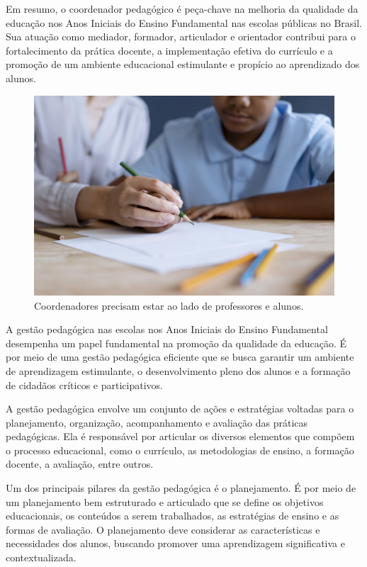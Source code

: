 Em resumo, o coordenador pedagógico é peça-chave na melhoria da
qualidade da educação nos Anos Iniciais do Ensino Fundamental nas
escolas públicas no Brasil. Sua atuação como mediador, formador,
articulador e orientador contribui para o fortalecimento da prática
docente, a implementação efetiva do currículo e a promoção de um
ambiente educacional estimulante e propício ao aprendizado dos alunos.

\begin{figure}
\centering
\includegraphics[width=\textwidth]{./imgs/Imagem004.jpg}
\caption{Coordenadores precisam estar ao lado de professores e alunos.}
\end{figure}

A gestão pedagógica nas escolas nos Anos Iniciais do Ensino Fundamental
desempenha um papel fundamental na promoção da qualidade da educação. É
por meio de uma gestão pedagógica eficiente que se busca garantir um
ambiente de aprendizagem estimulante, o desenvolvimento pleno dos alunos
e a formação de cidadãos críticos e participativos.

A gestão pedagógica envolve um conjunto de ações e estratégias voltadas
para o planejamento, organização, acompanhamento e avaliação das
práticas pedagógicas. Ela é responsável por articular os diversos
elementos que compõem o processo educacional, como o currículo, as
metodologias de ensino, a formação docente, a avaliação, entre outros.

Um dos principais pilares da gestão pedagógica é o planejamento. É por
meio de um planejamento bem estruturado e articulado que se define os
objetivos educacionais, os conteúdos a serem trabalhados, as estratégias
de ensino e as formas de avaliação. O planejamento deve considerar as
características e necessidades dos alunos, buscando promover uma
aprendizagem significativa e contextualizada.

